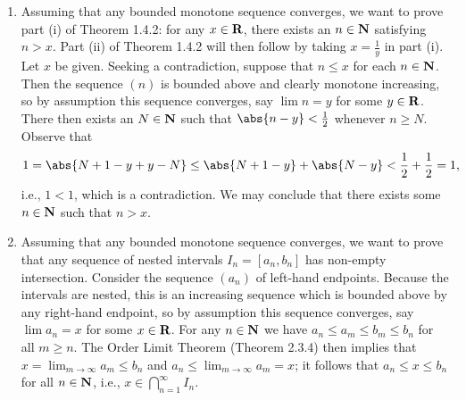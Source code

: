 \documentclass{lew98_solutions}
\begin{document}
\begin{solution}
    \begin{enumerate}
        \item Assuming that any bounded monotone sequence converges, we want to prove part (i) of Theorem 1.4.2: for any \( x \in \mathbf{R} \), there exists an \( n \in \mathbf{N} \) satisfying \( n > x \). Part (ii) of Theorem 1.4.2 will then follow by taking \( x = \tfrac{1}{y} \) in part (i). Let \( x \) be given. Seeking a contradiction, suppose that \( n \leq x \) for each \( n \in \mathbf{N} \). Then the sequence \( (n) \) is bounded above and clearly monotone increasing, so by assumption this sequence converges, say \( \lim n = y \) for some \( y \in \mathbf{R} \). There then exists an \( N \in \mathbf{N} \) such that \( \abs{n - y} < \tfrac{1}{2} \) whenever \( n \geq N \). Observe that
        \[
            1 = \abs{N + 1 - y + y - N} \leq \abs{N + 1 - y} + \abs{N - y} < \frac{1}{2} + \frac{1}{2} = 1,
        \]
        i.e., \( 1 < 1 \), which is a contradiction. We may conclude that there exists some \( n \in \mathbf{N} \) such that \( n > x \).

        \item Assuming that any bounded monotone sequence converges, we want to prove that any sequence of nested intervals \( I_n = [a_n, b_n] \) has non-empty intersection. Consider the sequence \( (a_n) \) of left-hand endpoints. Because the intervals are nested, this is an increasing sequence which is bounded above by any right-hand endpoint, so by assumption this sequence converges, say \( \lim a_n = x \) for some \( x \in \mathbf{R} \). For any \( n \in \mathbf{N} \) we have \( a_n \leq a_m \leq b_m \leq b_n \) for all \( m \geq n \). The Order Limit Theorem (Theorem 2.3.4) then implies that \( x = \lim_{m \to \infty} a_m \leq b_n \) and \( a_n \leq \lim_{m \to \infty} a_m = x \); it follows that \( a_n \leq x \leq b_n \) for all \( n \in \mathbf{N} \), i.e., \( x \in \bigcap_{n=1}^{\infty} I_n \).
        \begin{center}
        \end{center}
    \end{enumerate}
\end{solution}
\end{document}
